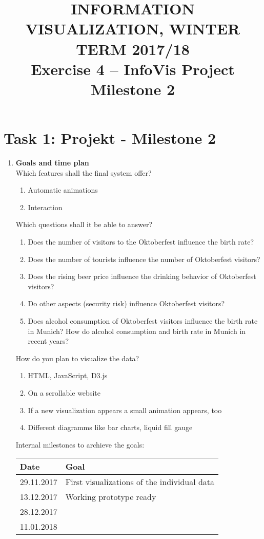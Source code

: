 \documentclass[11pt, twoside, BCOR=8mm, DIV=12]{scrartcl}
\title{{\Large INFORMATION VISUALIZATION, WINTER TERM 2017/18} \\ Exercise 4 – InfoVis Project Milestone 2}
\begin{document}
\maketitle
\section*{Task 1: Projekt - Milestone 2}
\begin{enumerate}[label=\alph*)]
\item \textbf{Goals and time plan}\\
Which features shall the final system offer?
\begin{enumerate}[label=\arabic*)]
\item Automatic animations
\item Interaction
\end{enumerate}
Which questions shall it be able to answer?
\begin{enumerate}[label=\arabic*)]
\item Does the number of visitors to the Oktoberfest influence the birth rate?
\item Does the number of tourists influence the number of Oktoberfest visitors?
\item Does the rising beer price influence the drinking behavior of Oktoberfest visitors?
\item Do other aspects (security risk) influence Oktoberfest visitors?
\item Does alcohol consumption of  Oktoberfest visitors influence the birth rate in Munich? How do alcohol consumption and birth rate in Munich in recent years?
\end{enumerate}
How do you plan to visualize the data?
\begin{enumerate}[label=\arabic*)]
\item HTML, JavaScript, D3.js
\item On a scrollable website
\item If a new visualization appears a small animation appears, too
\item Different diagramms like bar charts, liquid fill gauge
\end{enumerate}
Internal milestones to archieve the goals:
\begin{table}[H]
\begin{tabular}{l l}
Date & Goal \\
\hline
29.11.2017 & First visualizations of the individual data\\
\hline
13.12.2017 & Working prototype ready \\
\hline
28.12.2017 & \\
\hline
11.01.2018 & \\
\end{tabular}
\end{table}


\end{enumerate}
\end{document}
